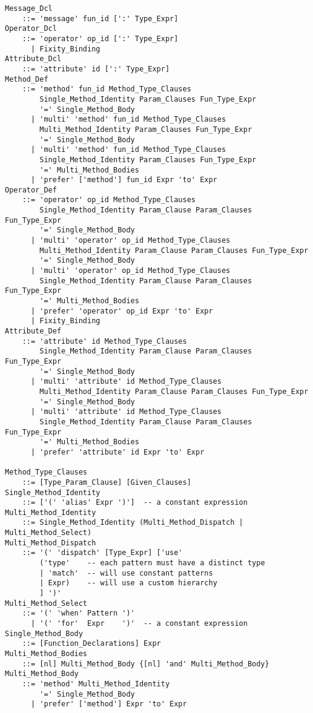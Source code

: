 \grammar\begin{lstlisting}
Message_Dcl 
    ::= 'message' fun_id [':' Type_Expr]
Operator_Dcl 
    ::= 'operator' op_id [':' Type_Expr]
      | Fixity_Binding
Attribute_Dcl 
    ::= 'attribute' id [':' Type_Expr]
Method_Def 
    ::= 'method' fun_id Method_Type_Clauses
        Single_Method_Identity Param_Clauses Fun_Type_Expr
        '=' Single_Method_Body
      | 'multi' 'method' fun_id Method_Type_Clauses
        Multi_Method_Identity Param_Clauses Fun_Type_Expr
        '=' Single_Method_Body
      | 'multi' 'method' fun_id Method_Type_Clauses 
        Single_Method_Identity Param_Clauses Fun_Type_Expr
        '=' Multi_Method_Bodies
      | 'prefer' ['method'] fun_id Expr 'to' Expr
Operator_Def
    ::= 'operator' op_id Method_Type_Clauses 
        Single_Method_Identity Param_Clause Param_Clauses Fun_Type_Expr
        '=' Single_Method_Body
      | 'multi' 'operator' op_id Method_Type_Clauses 
        Multi_Method_Identity Param_Clause Param_Clauses Fun_Type_Expr
        '=' Single_Method_Body
      | 'multi' 'operator' op_id Method_Type_Clauses
        Single_Method_Identity Param_Clause Param_Clauses Fun_Type_Expr
        '=' Multi_Method_Bodies
      | 'prefer' 'operator' op_id Expr 'to' Expr
      | Fixity_Binding
Attribute_Def
    ::= 'attribute' id Method_Type_Clauses
        Single_Method_Identity Param_Clause Param_Clauses Fun_Type_Expr
        '=' Single_Method_Body
      | 'multi' 'attribute' id Method_Type_Clauses
        Multi_Method_Identity Param_Clause Param_Clauses Fun_Type_Expr
        '=' Single_Method_Body
      | 'multi' 'attribute' id Method_Type_Clauses
        Single_Method_Identity Param_Clause Param_Clauses Fun_Type_Expr
        '=' Multi_Method_Bodies
      | 'prefer' 'attribute' id Expr 'to' Expr

Method_Type_Clauses
    ::= [Type_Param_Clause] [Given_Clauses]
Single_Method_Identity
    ::= ['(' 'alias' Expr ')']  -- a constant expression
Multi_Method_Identity
    ::= Single_Method_Identity (Multi_Method_Dispatch | Multi_Method_Select)
Multi_Method_Dispatch
    ::= '(' 'dispatch' [Type_Expr] ['use' 
        ('type'    -- each pattern must have a distinct type
        | 'match'  -- will use constant patterns
        | Expr)    -- will use a custom hierarchy
        ] ')'
Multi_Method_Select
    ::= '(' 'when' Pattern ')'
      | '(' 'for'  Expr    ')'  -- a constant expression
Single_Method_Body
    ::= [Function_Declarations] Expr
Multi_Method_Bodies
    ::= [nl] Multi_Method_Body {[nl] 'and' Multi_Method_Body}
Multi_Method_Body
    ::= 'method' Multi_Method_Identity 
        '=' Single_Method_Body
      | 'prefer' ['method'] Expr 'to' Expr


\end{lstlisting}

